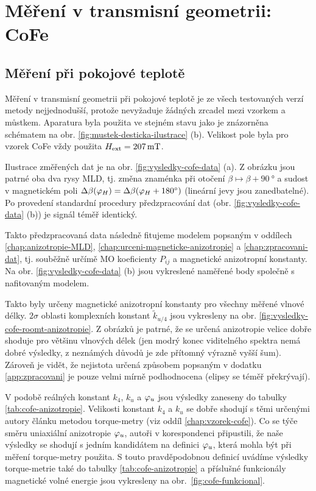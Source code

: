 \section{Měření v transmisní geometrii: CoFe}
\label{chap:vysledky-cofe}

\subsection{Měření při pokojové teplotě}
\label{chap:vysledky-cofe-roomt}

Měření v transmisní geometrii při pokojové teplotě je ze všech testovaných verzí metody nejjednodušší, protože nevyžaduje žádných zrcadel mezi vzorkem a můstkem.
Aparatura byla použita ve stejném stavu jako je znázorněna schématem na obr. \ref{fig:mustek-desticka-ilustrace} (b).
Velikost pole byla pro vzorek CoFe vždy použita $H_\textrm{ext}=\SI{207}{\milli\tesla}$.

Ilustrace změřených dat je na obr. \ref{fig:vysledky-cofe-data} (a).
Z obrázku jsou patrné oba dva rysy MLD, tj. změna znaménka při otočení $\beta \mapsto \beta+\SI{90}{\degree}$ a sudost v magnetickém poli $\Delta\beta(\varphi_H)=\Delta\beta(\varphi_H+\SI{180}{\degree})$ (lineární jevy jsou zanedbatelné).
Po provedení standardní procedury předzpracování dat (obr. \ref{fig:vysledky-cofe-data} (b)) je signál téměř identický.

Takto předzpracovaná data následně fitujeme modelem popsaným v oddílech \ref{chap:anizotropie-MLD}, \ref{chap:urceni-magneticke-anizotropie} a \ref{chap:zpracovani-dat}, tj. souběžně určímě MO koeficienty $P_{ij}$ a magnetické anizotropní konstanty.
Na obr. \ref{fig:vysledky-cofe-data} (b) jsou vykreslené naměřené body společně s nafitovaným modelem.

Takto byly určeny magnetické anizotropní konstanty pro všechny měřené vlnové délky.
$2\sigma$ oblasti komplexních konstant $\tilde{k}_{u/4}$ jsou vykresleny na obr. \ref{fig:vysledky-cofe-roomt-anizotropie}.
Z obrázků je patrné, že se určená anizotropie velice dobře shoduje pro většinu vlnových délek (jen modrý konec viditelného spektra nemá dobré výsledky, z neznámých důvodů je zde přítomný výrazně vyšší šum).
Zároveň je vidět, že nejistota určená způsobem popsaným v dodatku \ref{app:zpracovani} je pouze velmi mírně podhodnocena (elipsy se téměř překrývají).

V podobě reálných konstant $k_4$, $k_u$ a $\varphi_u$ jsou výsledky zaneseny do tabulky \ref{tab:cofe-anizotropie}.
Velikosti konstant $k_4$ a $k_u$ se dobře shodují s těmi určenými autory článku \cite{zengIntrinsicMechanismAnisotropic2020} metodou torque-metry (viz oddíl \ref{chap:vzorek-cofe}).
Co se týče směru uniaxiální anizotropie $\varphi_u$, autoři v korespondenci připustili, že naše výsledky se shodují s jedním kandidátem na definici $\varphi_u$, která mohla být při měření torque-metry použita.
S touto pravděpodobnou definicí uvádíme výsledky torque-metrie také do tabulky \ref{tab:cofe-anizotropie} a příslušné funkcionály magnetické volné energie jsou vykresleny na obr.~\ref{fig:cofe-funkcional}.

